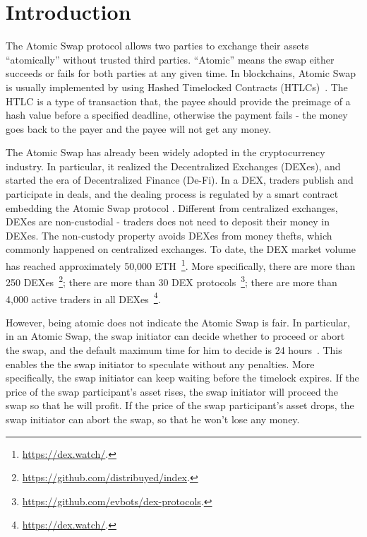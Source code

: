 \section{Introduction}
\label{sec:intro}

The Atomic Swap protocol allows two parties to exchange their assets ``atomically'' without trusted third parties.
``Atomic'' means the swap either succeeds or fails for both parties at any given time.
In blockchains, Atomic Swap is usually implemented by using Hashed Timelocked Contracts (HTLCs)~\cite{decker2015fast}.
The HTLC is a type of transaction that, the payee should provide the preimage of a hash value before a specified deadline, otherwise the payment fails - the money goes back to the payer and the payee will not get any money.

The Atomic Swap has already been widely adopted in the cryptocurrency industry.
In particular, it realized the Decentralized Exchanges (DEXes), and started the era of Decentralized Finance (De-Fi).
In a DEX, traders publish and participate in deals, and the dealing process is regulated by a smart contract embedding the Atomic Swap protocol .
Different from centralized exchanges, DEXes are non-custodial - traders does not need to deposit their money in DEXes.
The non-custody property avoids DEXes from money thefts, which commonly happened on centralized exchanges.
To date, the DEX market volume has reached approximately 50,000 ETH~\footnote{\url{https://dex.watch/}.}.
More specifically,
there are more than 250 DEXes~\footnote{\url{https://github.com/distribuyed/index}.};
there are more than 30 DEX protocols~\footnote{\url{https://github.com/evbots/dex-protocols}.};
there are more than 4,000 active traders in all DEXes~\footnote{\url{https://dex.watch/}.}.



However, being atomic does not indicate the Atomic Swap is fair.
In particular, in an Atomic Swap, the swap initiator can decide whether to proceed or abort the swap, and the default maximum time for him to decide is 24 hours~\cite{nolan2013alt}.
This enables the the swap initiator to speculate without any penalties.
More specifically, the swap initiator can keep waiting before the timelock expires.
If the price of the swap participant's asset rises, the swap initiator will proceed the swap so that he will profit.
If the price of the swap participant's asset drops, the swap initiator can abort the swap, so that he won't lose any money.

